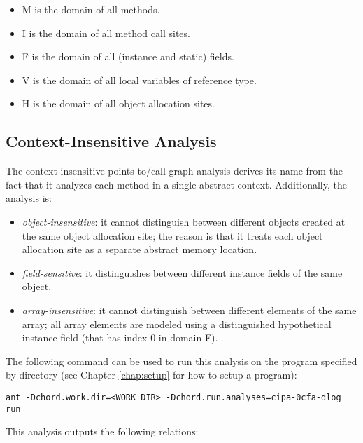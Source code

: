 \texonly{\newpage}

\begin{itemize}
\item M is the domain of all methods.
\item I is the domain of all method call sites.
\item F is the domain of all (instance and static) fields.
\item V is the domain of all local variables of reference type.
\item H is the domain of all object allocation sites.
\end{itemize}

\subsection{Context-Insensitive Analysis}

The context-insensitive points-to/call-graph analysis derives its name from the
fact that it analyzes each method in a single abstract context.
Additionally, the analysis is:
\begin{itemize}
\item
{\it object-insensitive}: it cannot distinguish between
different objects created at the same object allocation site; the reason is that
it treats each object allocation site as a separate abstract memory location.
\item
{\it field-sensitive}: it distinguishes between
different instance fields of the same object.
\item
{\it array-insensitive}: it cannot distinguish between
different elements of the same array; all array elements are modeled using a
distinguished hypothetical instance field (that has index 0 in domain F).
\end{itemize}

The following command can be used to run this analysis on the program specified
by directory  (see Chapter \ref{chap:setup} for how to setup a
program):

\begin{framed}
\begin{verbatim}
ant -Dchord.work.dir=<WORK_DIR> -Dchord.run.analyses=cipa-0cfa-dlog run
\end{verbatim}
\end{framed}

This analysis outputs the following relations:

